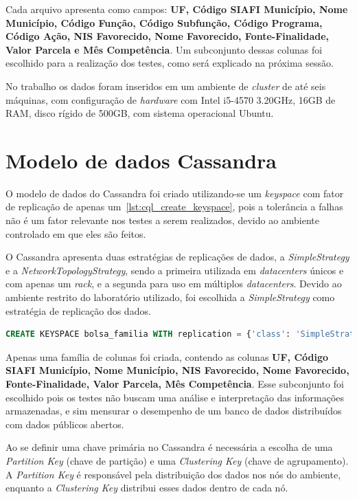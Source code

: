 Cada arquivo apresenta como campos: \textbf{UF, Código SIAFI Município, Nome Município, Código Função, Código Subfunção, Código Programa, Código Ação, NIS Favorecido, Nome Favorecido, Fonte-Finalidade, Valor Parcela e Mês Competência}. Um subconjunto dessas colunas foi escolhido para a realização dos testes, como será explicado na próxima sessão.

No trabalho os dados foram inseridos em um ambiente de \emph{cluster} de até seis máquinas, com configuração de \emph{hardware} com Intel i5-4570 3.20GHz, 16GB de RAM, disco rígido de 500GB, com sistema operacional Ubuntu.

\section{Modelo de dados Cassandra}
O modelo de dados do Cassandra foi criado utilizando-se um \emph{keyspace} com fator de replicação de apenas um~\ref{lst:cql_create_keyspace}, pois a tolerância a falhas não é um fator relevante nos testes a serem realizados, devido ao ambiente controlado em que eles são feitos.

O Cassandra apresenta duas estratégias de replicações de dados, a \emph{SimpleStrategy} e a \emph{NetworkTopologyStrategy}, sendo a primeira utilizada em \emph{datacenters} únicos e com apenas um \emph{rack}, e a segunda para uso em múltiplos \emph{datacenters}. Devido ao ambiente restrito do laboratório utilizado, foi escolhida a \emph{SimpleStrategy} como estratégia de replicação dos dados.

\noindent
\begin{minipage}[c]{1\textwidth}
\begin{lstlisting}[caption={Código CQL criação do keyspace},label={lst:cql_create_keyspace},language=SQL]
CREATE KEYSPACE bolsa_familia WITH replication = {'class': 'SimpleStrategy', 'replication_factor': 1};
\end{lstlisting}
\end{minipage}

Apenas uma família de colunas foi criada, contendo as colunas \textbf{UF, Código SIAFI Município, Nome Município, NIS Favorecido, Nome Favorecido, Fonte-Finalidade, Valor Parcela, Mês Competência}. Esse subconjunto foi escolhido pois os testes não buscam uma análise e interpretação das informações armazenadas, e sim mensurar o desempenho de um banco de dados distribuídos com dados públicos abertos.

Ao se definir uma chave primária no Cassandra é necessária a escolha de uma \emph{Partition Key} (chave de partição) e uma \emph{Clustering Key} (chave de agrupamento). A \emph{Partition Key} é responsável pela distribuição dos dados nos nós do ambiente, enquanto a \emph{Clustering Key} distribui esses dados dentro de cada nó.

